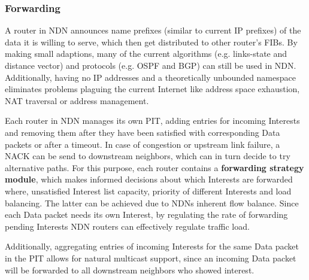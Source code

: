 \subsubsection{Forwarding}

A router in NDN announces name prefixes (similar to current IP prefixes) of the data it is willing to serve, which then get distributed to other router's FIBs. By making small adaptions, many of the current algorithms (e.g. links-state and distance vector) and protocols (e.g. OSPF and BGP) can still be used in NDN. Additionally, having no IP addresses and a theoretically unbounded namespace eliminates problems plaguing the current Internet like address space exhaustion, NAT traversal or address management. 

Each router in NDN manages its own PIT, adding entries for incoming Interests and removing them after they have been satisfied with corresponding Data packets or after a timeout. In case of congestion or upstream link failure, a NACK can be send to downstream neighbors, which can in turn decide to try alternative paths. For this purpose, each router contains a \textbf{forwarding strategy module}, which makes informed decisions about which Interests are forwarded where, unsatisfied Interest list capacity, priority of different Interests and load balancing. The latter can be achieved due to NDNs inherent flow balance. Since each Data packet needs its own Interest, by regulating the rate of forwarding pending Interests NDN routers can effectively regulate traffic load.

Additionally, aggregating entries of incoming Interests for the same Data packet in the PIT allows for natural multicast support, since an incoming Data packet will be forwarded to all downstream neighbors who showed interest. \cite{ZABJ14}
